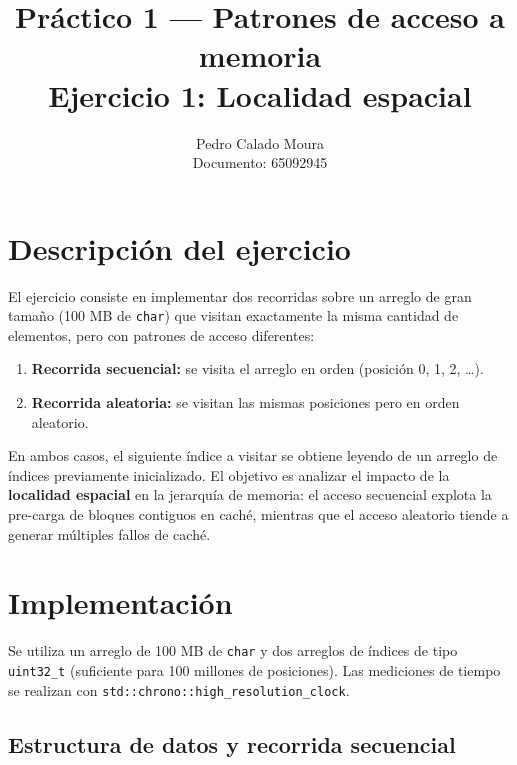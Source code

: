 \documentclass[11pt,a4paper]{article}
\title{Práctico 1 --- Patrones de acceso a memoria\\
       \large Ejercicio 1: Localidad espacial}
\author{Pedro Calado Moura\\
        Documento: 65092945}
\date{}
\begin{document}
\maketitle

\section{Descripción del ejercicio}

El ejercicio consiste en implementar dos recorridas sobre un arreglo de gran tamaño (100 MB de \texttt{char}) que visitan exactamente la misma cantidad de elementos, pero con patrones de acceso diferentes:

\begin{enumerate}
\item \textbf{Recorrida secuencial:} se visita el arreglo en orden (posición 0, 1, 2, \ldots).
\item \textbf{Recorrida aleatoria:} se visitan las mismas posiciones pero en orden aleatorio.
\end{enumerate}

En ambos casos, el siguiente índice a visitar se obtiene leyendo de un arreglo de índices previamente inicializado. El objetivo es analizar el impacto de la \textbf{localidad espacial} en la jerarquía de memoria: el acceso secuencial explota la pre-carga de bloques contiguos en caché, mientras que el acceso aleatorio tiende a generar múltiples fallos de caché.

\section{Implementación}

Se utiliza un arreglo de 100 MB de \texttt{char} y dos arreglos de índices de tipo \texttt{uint32\_t} (suficiente para 100 millones de posiciones). Las mediciones de tiempo se realizan con \texttt{std::chrono::high\_resolution\_clock}.

\subsection{Estructura de datos y recorrida secuencial}
\end{document}
